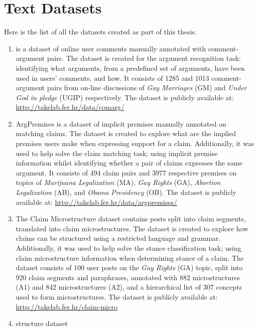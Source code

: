 \chapter{Text Datasets}
\label{chap:appendix_datasets}

Here is the list of all the datasets created as part of this thesis.

\begin{enumerate}[label=\textbf{A.\arabic*}]
\item\label{item:comarg} \ComArg is a dataset of online user comments manually annotated with
comment-argument pairs. The dataset is created for the argument
recognition task: identifying what arguments, from a predefined
set of arguments, have been used in users' comments, and how.
It consists of 1285 and 1013 comment-argument pairs from 
on-line discussions of \emph{Gay Marriages} (GM) 
and \emph{Under God in pledge} (UGIP) respectively.
The dataset is publicly available at:
\url{http://takelab.fer.hr/data/comarg/}

\item\label{item:argpremises} ArgPremises is a dataset of 
implicit premises manually annotated on matching claims. 
The dataset is created to explore what are the implied premises users 
make when expressing support for a claim.
Additionally, it was used to help solve the claim matching task; 
using implicit premise information whilst 
identifying whether a pair of claims expresses the same argument. 
It consists of 494 claim pairs and 3977 respective premises on topics
of \emph{Marijuana Legalization} (MA), \emph{Gay Rights} (GA), 
\emph{Abortion Legalization} (AB),
and \emph{Obama Presidency} (OB).
The dataset is publicly available at:
\url{http://takelab.fer.hr/data/argpremises/}

\item\label{item:microstructures_dataset} The Claim Microstructure dataset contains posts split into claim
segments, translated into claim microstructures. The dataset is created
to explore how claims can be structured using a restricted
language and grammar. Additionally, it was used to help solve
the stance classification task; using claim microstructure
information when determining stance of a claim. 
The dataset consists of 
100 user posts on the \emph{Gay Rights} (GA) topic, 
split into 920 claim segments and paraphrases, annotated with
882 microstructures (A1) and 842 microstructures (A2), and a hierarchical 
list of 307 concepts used to form microstructures. 
The dataset is publicly available at:
\url{http://takelab.fer.hr/claim-micro}

\item\label{item:structure_dataset} structure dataset %

\end{enumerate}
